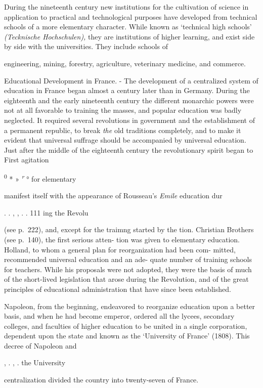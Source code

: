 \documentclass[]{book}
\begin{document}
During the nineteenth century new institutions for the cultivation of science in application to practical and technological purposes have developed from technical schools of a more elementary character. While known as `technical high schools' \emph{(Tecknische Hochschulen),} they are institutions of higher learning, and exist side by side with the universities. They include schools of

engineering, mining, forestry, agriculture, veterinary medicine, and commerce.

Educational Development in France. - The development of a centralized system of education in France began almost a century later than in Germany. During the eighteenth and the early nineteenth century the different monarchic powers were not at all favorable to training the masses, and popular education was badly neglected. It required several revolutions in government and the establishment of a permanent republic, to break \emph{the} old traditions completely, and to make it evident that universal suffrage should be accompanied by universal education. Just after the middle of the eighteenth century the revolutionary spirit began to First agitation

\textsuperscript{0} * » \emph{\textsuperscript{r}} ° for elementary

manifest itself with the appearance of Rousseau's \emph{Emile} education dur

. . , , . . 111 ing the Revolu

(see p.~222), and, except for the traimng started by the tion. Christian Brothers (see p.~140), the first serious atten- tion was given to elementary education. Holland, to whom a general plan for reorganization had been com- mitted, recommended universal education and an ade- quate number of training schools for teachers. While his proposals were not adopted, they were the basis of much of the short-lived legislation that arose during the Revolution, and of the great principles of educational administration that have since been established.

Napoleon, from the beginning, endeavored to reorganize education upon a better basis, and when he had become emperor, ordered all the lycees, secondary colleges, and faculties of higher education to be united in a single corporation, dependent upon the state and known as the `University of France' (1808). This decree of Napoleon and

, . , . the University

centralization divided the country into twenty-seven of France.
\end{document}

